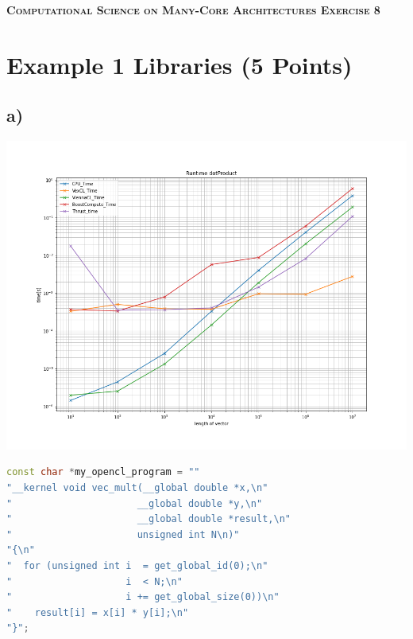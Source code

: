 \documentclass[11pt,a4paper]{article}
\begin{document}
\begin{center}
	\fontsize{24pt}{10pt}\selectfont
	\textsc{\textbf{Computational Science on Many-Core Architectures  Exercise 8}}
\end{center}
\section*{Example 1 Libraries (5 Points)}
\subsection*{a)}

\begin{center}
	\begin{minipage}[t]{0.5\textwidth}
		\includegraphics[width=\textwidth]{Bilder/Runtime_dotProduct}
	\end{minipage}
\end{center}

\begin{lstlisting}[language=C++, caption={opencl kernel}]
const char *my_opencl_program = ""
"__kernel void vec_mult(__global double *x,\n"
"                      __global double *y,\n"
"                      __global double *result,\n"
"                      unsigned int N\n)"
"{\n"
"  for (unsigned int i  = get_global_id(0);\n"
"                    i  < N;\n"
"                    i += get_global_size(0))\n"
"    result[i] = x[i] * y[i];\n"
"}"; 
\end{lstlisting}
\end{document}
